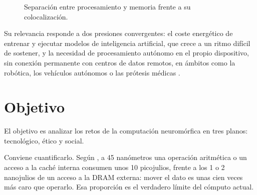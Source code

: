 \documentclass[a4paper,11pt,oneside]{book}
\begin{document}
\begin{figure}[H]
\centering
{}
\caption{Separación entre procesamiento y memoria frente a su colocalización.}
\label{fig:arquitectura}
\end{figure}

Su relevancia responde a dos presiones convergentes: el coste energético de
entrenar y ejecutar modelos de inteligencia artificial, que crece a un ritmo
difícil de sostener, y la necesidad de procesamiento autónomo en el propio
dispositivo, sin conexión permanente con centros de datos remotos, en ámbitos
como la robótica, los vehículos autónomos o las prótesis médicas
\parencite{roy2019}.

\section{Objetivo}

El objetivo es analizar los retos de la computación neuromórfica en tres planos:
tecnológico, ético y social.

Conviene cuantificarlo. Según \textcite{horowitz2014}, a 45 nanómetros una
operación aritmética o un acceso a la caché interna consumen unos 10 picojulios,
frente a los 1 o 2 nanojulios de un acceso a la DRAM externa: mover el dato es
unas cien veces más caro que operarlo. Esa proporción es el verdadero límite del
cómputo actual.
\end{document}
